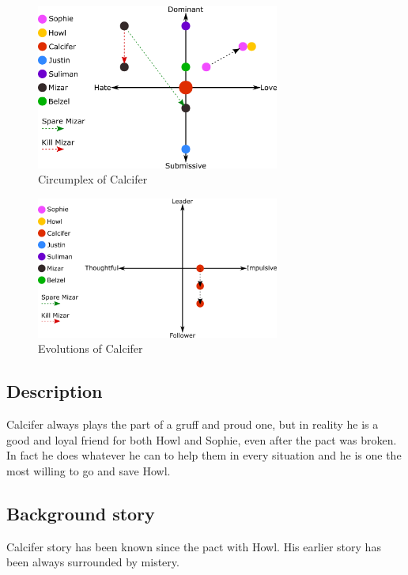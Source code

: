 \begin{figure}[H]
  \centering
  \includegraphics[width=8cm]{Images/SVG/Exported/Circumplexes/calciferCircumplex}
  \caption{Circumplex of Calcifer}
\end{figure}

\begin{figure}[H]
  \centering
   \includegraphics[width=8cm]{Images/SVG/Exported/Evolutions/calciferEvolution}
  \caption{Evolutions of Calcifer}
\end{figure}

\subsection{Description}
Calcifer always plays the part of a gruff and proud one, but in reality he is a good and loyal friend for both Howl and Sophie, even after the pact was broken. In fact he does whatever he can to help them in every situation and he is one the most willing to go and save Howl.

\subsection{Background story}
Calcifer story has been known since the pact with Howl. His earlier story has been always surrounded by mistery.
